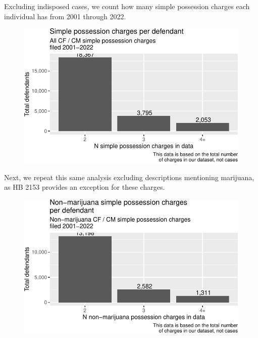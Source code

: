 \documentclass[
  letterpaper,
  DIV=11,
  numbers=noendperiod]{scrartcl}
\begin{document}
Excluding indisposed cases, we count how many simple possession charges
each individual has from 2001 through 2022.

\begin{figure}

{\centering \includegraphics{hb2153_files/figure-pdf/conviction-count-plot-1.pdf}

}

\end{figure}

Next, we repeat this same analysis excluding descriptions mentioning
marijuana, as HB 2153 provides an exception for these charges.

\begin{figure}

{\centering \includegraphics{hb2153_files/figure-pdf/unnamed-chunk-7-1.pdf}

}

\end{figure}
\end{document}
